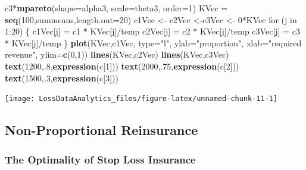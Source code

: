 \documentclass[]{book}
\newenvironment{Shaded}{\begin{snugshade}}{\end{snugshade}}
\newcommand{\KeywordTok}[1]{\textcolor[rgb]{0.13,0.29,0.53}{\textbf{{#1}}}}
\newcommand{\DataTypeTok}[1]{\textcolor[rgb]{0.13,0.29,0.53}{{#1}}}
\newcommand{\DecValTok}[1]{\textcolor[rgb]{0.00,0.00,0.81}{{#1}}}
\newcommand{\StringTok}[1]{\textcolor[rgb]{0.31,0.60,0.02}{{#1}}}
\newcommand{\NormalTok}[1]{{#1}}
\theoremstyle{definition}
\theoremstyle{definition}
\theoremstyle{definition}
\theoremstyle{remark}
\begin{document}
\begin{Shaded}
\begin{Highlighting}[]
\StringTok{       }\NormalTok{c3*}\KeywordTok{mpareto}\NormalTok{(}\DataTypeTok{shape=}\NormalTok{alpha3, }\DataTypeTok{scale=}\NormalTok{theta3, }\DataTypeTok{order=}\DecValTok{1}\NormalTok{)  }
\NormalTok{KVec =}\StringTok{ }\KeywordTok{seq}\NormalTok{(}\DecValTok{100}\NormalTok{,summeans,}\DataTypeTok{length.out=}\DecValTok{20}\NormalTok{)}
\NormalTok{c1Vec <-}\StringTok{ }\NormalTok{c2Vec <-c3Vec <-}\StringTok{ }\DecValTok{0}\NormalTok{*KVec }
\NormalTok{for (j in }\DecValTok{1}\NormalTok{:}\DecValTok{20}\NormalTok{) \{}
  \NormalTok{c1Vec[j] =}\StringTok{ }\NormalTok{c1 *}\StringTok{ }\NormalTok{KVec[j]/temp}
  \NormalTok{c2Vec[j] =}\StringTok{ }\NormalTok{c2 *}\StringTok{ }\NormalTok{KVec[j]/temp}
  \NormalTok{c3Vec[j] =}\StringTok{ }\NormalTok{c3 *}\StringTok{ }\NormalTok{KVec[j]/temp}
  \NormalTok{\}}
\KeywordTok{plot}\NormalTok{(KVec,c1Vec, }\DataTypeTok{type=}\StringTok{"l"}\NormalTok{, }\DataTypeTok{ylab=}\StringTok{"proportion"}\NormalTok{, }\DataTypeTok{xlab=}\StringTok{"required revenue"}\NormalTok{, }\DataTypeTok{ylim=}\KeywordTok{c}\NormalTok{(}\DecValTok{0}\NormalTok{,}\DecValTok{1}\NormalTok{))}
\KeywordTok{lines}\NormalTok{(KVec,c2Vec)}
\KeywordTok{lines}\NormalTok{(KVec,c3Vec)}
\KeywordTok{text}\NormalTok{(}\DecValTok{1200}\NormalTok{,.}\DecValTok{8}\NormalTok{,}\KeywordTok{expression}\NormalTok{(c[}\DecValTok{1}\NormalTok{]))}
\KeywordTok{text}\NormalTok{(}\DecValTok{2000}\NormalTok{,.}\DecValTok{75}\NormalTok{,}\KeywordTok{expression}\NormalTok{(c[}\DecValTok{2}\NormalTok{]))}
\KeywordTok{text}\NormalTok{(}\DecValTok{1500}\NormalTok{,.}\DecValTok{3}\NormalTok{,}\KeywordTok{expression}\NormalTok{(c[}\DecValTok{3}\NormalTok{]))}
\end{Highlighting}
\end{Shaded}

\begin{center}\texttt{[image: LossDataAnalytics\_files/figure-latex/unnamed-chunk-11-1]} \end{center}

\subsection{Non-Proportional
Reinsurance}\label{non-proportional-reinsurance}

\subsubsection{The Optimality of Stop Loss
Insurance}\label{the-optimality-of-stop-loss-insurance}
\end{document}
